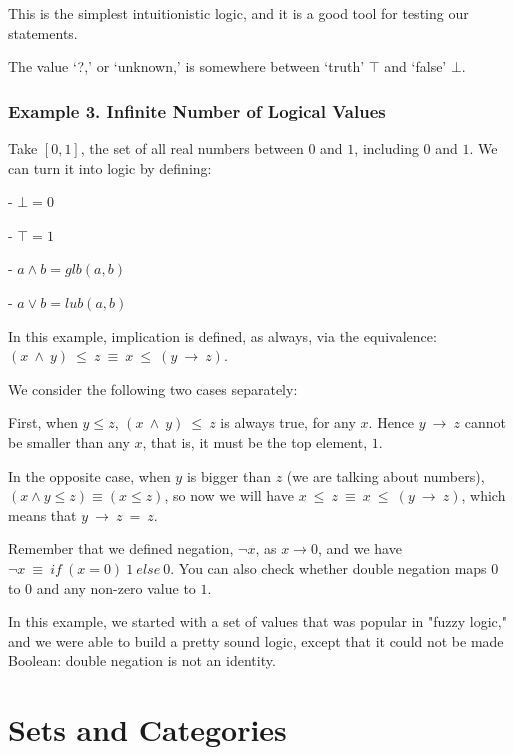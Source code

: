 \documentclass[10pt]{asme2ej}
\begin{document}
This is the simplest intuitionistic logic, and it is a good tool for testing our statements.

The value ‘?,’ or ‘unknown,’ is somewhere between ‘truth’ $\top$ and ‘false’ $\bot$.

\subsubsection{Example 3. Infinite Number of Logical Values}

Take $[0,1]$, the set of all real numbers between $0$ and $1$, including
$0$ and $1$. We can turn it into logic by defining:

-   $\bot = 0$

-   $\top =1$

-   $a \land b = glb(a,b)$

-   $a \lor b = lub(a,b)$

In this example, implication is defined, as always, via the equivalence:
$(x~\land~y)~\leq~z~\equiv~x~\leq~(y~\rightarrow~z)$. 


We consider the following two cases separately:
 

First, when $y\leq z$, 
$(x~\land~y)~\leq~z$ is always true, for any $x$. Hence $y~\rightarrow~z$
cannot be smaller than any $x$, that is, it must be the top element, $1$.


In the opposite case, when $y$ is bigger than $z$ (we are talking about numbers),
$( x \land y \leq z) \equiv ( x \leq z )$, so now we will have 
$x~\leq~z~\equiv~x~\leq~(y~\rightarrow~z)$, which means that $y~\rightarrow~z~=~z$.

Remember that we defined negation, $\neg x$, as $x\rightarrow 0$, and we have
$\neg x\ \equiv\ if\ (x = 0)\ 1\ else\ 0$. You can also check whether double
negation maps $0$ to $0$ and any non-zero value to $1$.

In this example, we started with a set of values that was popular in "fuzzy logic," and we were able to build
a pretty sound logic, except that it could not be made Boolean: double negation is not an identity.

\section{Sets and Categories}
 \\
 
\end{document}

